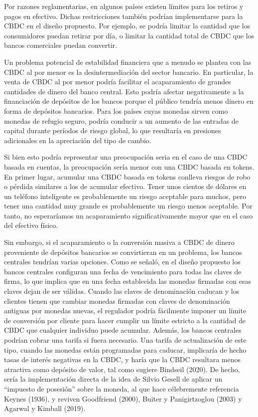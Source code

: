 \documentclass[10pt,spanish]{article}
\begin{document}
Por razones reglamentarias, en algunos países existen límites para los
retiros y pagos en efectivo. Dichas restricciones también podrían
implementarse para la CBDC en el diseño propuesto. Por ejemplo, se
podría limitar la cantidad que los consumidores puedan retirar por día,
o limitar la cantidad total de CBDC que los bancos comerciales puedan
convertir.

Un problema potencial de estabilidad financiera que a menudo se plantea
con las CBDC al por menor es la desintermediación del sector bancario.
En particular, la venta de CBDC al por menor podría facilitar el
acaparamiento de grandes cantidades de dinero del banco central. Esto
podría afectar negativamente a la financiación de depósitos de los
bancos porque el público tendría menos dinero en forma de depósitos
bancarios. Para los países cuyas monedas sirven como monedas de refugio
seguro, podría conducir a un aumento de las entradas de capital durante
períodos de riesgo global, lo que resultaría en presiones adicionales en
la apreciación del tipo de cambio.

Si bien esto podría representar una preocupación seria en el caso de una
CBDC basada en cuentas, la preocupación sería menor con una CBDC basada
en tokens. En primer lugar, acumular una CBDC basada en tokens conlleva
riesgos de robo o pérdida similares a los de acumular efectivo. Tener
unos cientos de dólares en un teléfono inteligente es probablemente un
riesgo aceptable para muchos, pero tener una cantidad muy grande es
probablemente un riesgo menos aceptable. Por tanto, no esperaríamos un
acaparamiento significativamente mayor que en el caso del efectivo
físico.

Sin embargo, si el acaparamiento o la conversión masiva a CBDC de dinero
proveniente de depósitos bancarios se convirtieran en un problema, los
bancos centrales tendrían varias opciones. Como se señaló, en el diseño
propuesto los bancos centrales configuran una fecha de vencimiento para
todas las claves de firma, lo que implica que en una fecha establecida
las monedas firmadas con esas claves dejan de ser válidas. Cuando las
claves de denominación caducan y los clientes tienen que cambiar monedas
firmadas con claves de denominación antiguas por monedas nuevas, el
regulador podría fácilmente imponer un límite de conversión por cliente
para hacer cumplir un límite estricto a la cantidad de CBDC que
cualquier individuo puede acumular. Además, los bancos centrales podrían
cobrar una tarifa si fuera necesario. Una tarifa de actualización de
este tipo, cuando las monedas están programadas para caducar, implicaría
de hecho tasas de interés negativas en la CBDC, y haría que la CBDC
resultara menos atractiva como depósito de valor, tal como sugiere
Bindseil (2020). De hecho, sería la implementación directa de la idea de
Silvio Gesell de aplicar un ``impuesto de posesión'' sobre la moneda, al
que hace célebremente referencia Keynes (1936), y reviven Goodfriend
(2000), Buiter y Panigirtzoglou (2003) y Agarwal y Kimball (2019).
\end{document}
